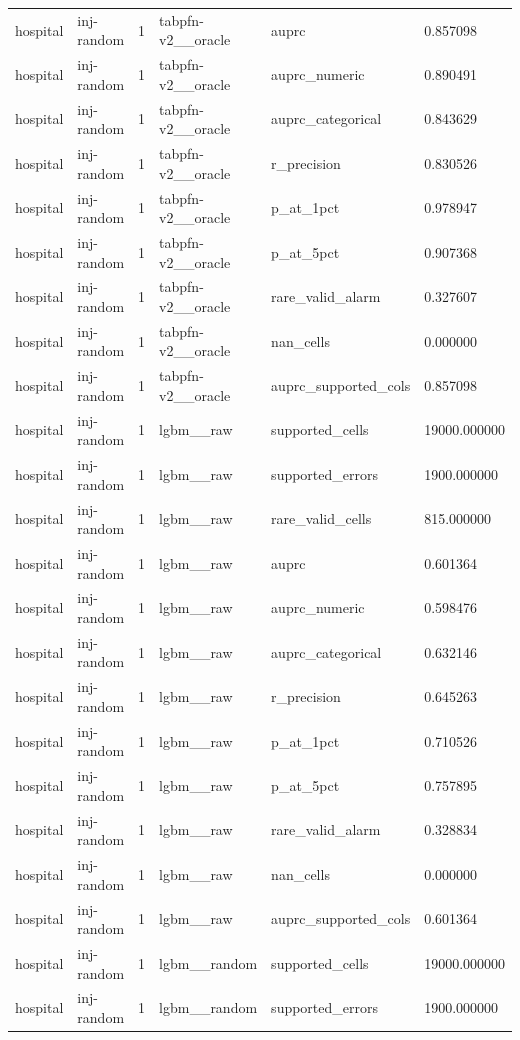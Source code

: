 \begin{tabular}{llllll}
hospital & inj-random & 1 & tabpfn-v2\_\_oracle & auprc & 0.857098 \\
hospital & inj-random & 1 & tabpfn-v2\_\_oracle & auprc\_numeric & 0.890491 \\
hospital & inj-random & 1 & tabpfn-v2\_\_oracle & auprc\_categorical & 0.843629 \\
hospital & inj-random & 1 & tabpfn-v2\_\_oracle & r\_precision & 0.830526 \\
hospital & inj-random & 1 & tabpfn-v2\_\_oracle & p\_at\_1pct & 0.978947 \\
hospital & inj-random & 1 & tabpfn-v2\_\_oracle & p\_at\_5pct & 0.907368 \\
hospital & inj-random & 1 & tabpfn-v2\_\_oracle & rare\_valid\_alarm & 0.327607 \\
hospital & inj-random & 1 & tabpfn-v2\_\_oracle & nan\_cells & 0.000000 \\
hospital & inj-random & 1 & tabpfn-v2\_\_oracle & auprc\_supported\_cols & 0.857098 \\
hospital & inj-random & 1 & lgbm\_\_raw & supported\_cells & 19000.000000 \\
hospital & inj-random & 1 & lgbm\_\_raw & supported\_errors & 1900.000000 \\
hospital & inj-random & 1 & lgbm\_\_raw & rare\_valid\_cells & 815.000000 \\
hospital & inj-random & 1 & lgbm\_\_raw & auprc & 0.601364 \\
hospital & inj-random & 1 & lgbm\_\_raw & auprc\_numeric & 0.598476 \\
hospital & inj-random & 1 & lgbm\_\_raw & auprc\_categorical & 0.632146 \\
hospital & inj-random & 1 & lgbm\_\_raw & r\_precision & 0.645263 \\
hospital & inj-random & 1 & lgbm\_\_raw & p\_at\_1pct & 0.710526 \\
hospital & inj-random & 1 & lgbm\_\_raw & p\_at\_5pct & 0.757895 \\
hospital & inj-random & 1 & lgbm\_\_raw & rare\_valid\_alarm & 0.328834 \\
hospital & inj-random & 1 & lgbm\_\_raw & nan\_cells & 0.000000 \\
hospital & inj-random & 1 & lgbm\_\_raw & auprc\_supported\_cols & 0.601364 \\
hospital & inj-random & 1 & lgbm\_\_random & supported\_cells & 19000.000000 \\
hospital & inj-random & 1 & lgbm\_\_random & supported\_errors & 1900.000000 \\

\end{tabular}
